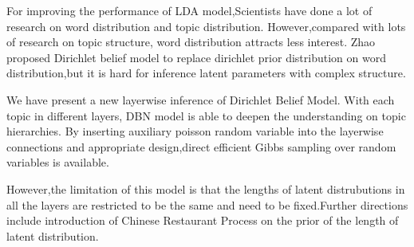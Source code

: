 For improving the performance of LDA model,Scientists have done a lot of research on word distribution and topic distribution. However,compared with lots of research on topic structure, word distribution attracts less interest. Zhao\cite{Zhao} proposed Dirichlet belief model to replace dirichlet prior distribution on word distribution,but it is hard for inference latent parameters with complex structure.

We have present a new layerwise inference of Dirichlet Belief Model. With each topic in different layers, DBN model is able to deepen the understanding on topic hierarchies. By inserting auxiliary poisson random variable into the layerwise connections and appropriate design,direct efficient Gibbs sampling over random variables is available.

However,the limitation of this model is that the lengths of latent distrubutions in all the layers are restricted to be the same and need to be fixed.Further directions include introduction of Chinese Restaurant Process on the prior of the length of latent distribution.
